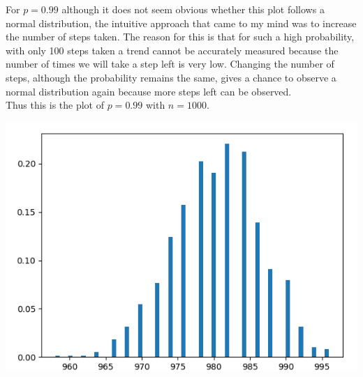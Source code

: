 \documentclass[addpoints]{exam}
\begin{document}
\begin{questions}
For $p=0.99$ although it does not seem obvious whether this plot follows a normal distribution, the intuitive approach that came to my mind was to increase the number of steps taken. The reason for this is that for such a high probability, with only 100 steps taken a trend cannot be accurately measured because the number of times we will take a step left is very low. Changing the number of steps, although the probability remains the same, gives a chance to observe a normal distribution again because more steps left can be observed. \\Thus this is the plot of $p=0.99$ with $n=1000$.\\
\begin{center}
\includegraphics[width=.48\textwidth]{images/p1_1_5.png}
\end{center}

\newpage
\question


\end{questions}
\end{document}
